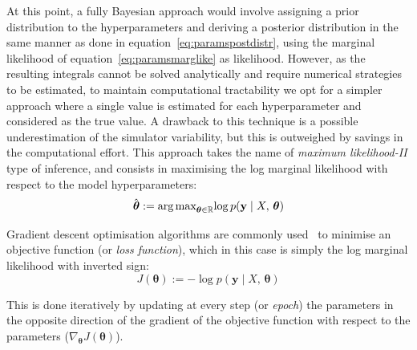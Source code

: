 \vspace{0.2cm}
At this point, a fully Bayesian approach would involve assigning a prior distribution to the hyperparameters and deriving a posterior distribution in the same manner as done in equation~\eqref{eq:paramspostdistr}, using the marginal likelihood of equation~\eqref{eq:paramsmarglike} as likelihood. However, as the resulting integrals cannot be solved analytically and require numerical strategies to be estimated, to maintain computational tractability we opt for a simpler approach where a single value is estimated for each hyperparameter and considered as the true value. A drawback to this technique is a possible underestimation of the simulator variability, but this is outweighed by savings in the computational effort. This approach takes the name of \textit{maximum likelihood-II} type of inference, and consists in maximising the log marginal likelihood with respect to the model hyperparameters:
%
\begin{equation}
    \hat{\boldsymbol{\theta}} := \textrm{arg\,max}_{\boldsymbol{\theta}\in\mathbb{R}}{\log{p(\mathbf{y}\;\vert\; X,\,\boldsymbol{\theta})}}
\end{equation}

\noindent
Gradient descent optimisation algorithms are commonly used~\cite{Ruder:2016} to minimise an objective function (or \textit{loss function}), which in this case is simply the log marginal likelihood with inverted sign:
%
\begin{equation}
    J(\boldsymbol{\theta}) := -\log{p(\mathbf{y}\;\vert\; X,\,\boldsymbol{\theta})}
\end{equation}

\noindent
This is done iteratively by updating at every step (or \textit{epoch}) the parameters in the opposite direction of the gradient of the objective function with respect to the parameters ($\nabla_{\boldsymbol{\theta}}J(\boldsymbol{\theta})$).


%
%
%
